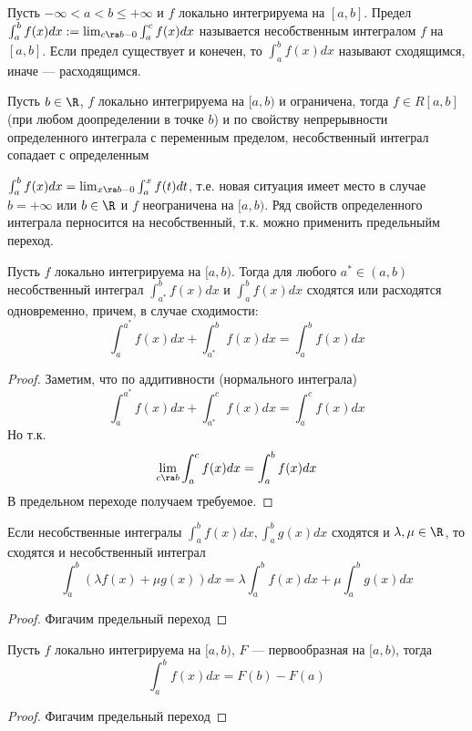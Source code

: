\begin{definition}
    Пусть $-\infty < a < b \le +\infty$ и $f$ локально интегрируема на $[a, b]$. Предел $\int_a^b f(x)dx := \lim_{c \ra b - 0}\int_{a}^{c}f(x)dx$ называется несобственным интегралом $f$ на $[a, b]$. Если предел существует и конечен, то $\int_{a}^{b}f(x)dx$ называют сходящимся, иначе --- расходящимся.
\end{definition}

Пусть $b \in \R$, $f$ локально интегрируема на $[a, b)$ и ограничена, тогда $f \in R[a, b]$ (при любом доопределении в точке $b$) и по свойству непрерывности определенного интеграла с переменным пределом, несобственный интеграл сопадает с определенным

$\int_{a}^{b}f(x)dx = \lim_{x \ra b - 0} \int_{a}^{x}f(t)dt$, т.е. новая ситуация имеет место в случае $b = +\infty$ или $b \in \R$ и $f$ неограничена на $[a, b)$. Ряд свойств определенного интеграла перносится на несобственный, т.к. можно применить предельныйм переход.

\begin{proposition}
    Пусть $f$ локально интегрируема на $[a, b)$. Тогда для любого $a^* \in (a, b)$ несобственный интеграл $\int_{a^*}^{b}f(x)dx$ и $\int_{a}^{b}f(x)dx$ сходятся или расходятся одновременно, причем, в случае сходимости:
    $$\int_{a}^{a^*}f(x)dx + \int_{a^*}^{b}f(x)dx = \int_{a}^{b}f(x)dx$$
\end{proposition}
\begin{proof}
    Заметим, что по аддитивности (нормального интеграла)
    $$\int_{a}^{a^*}f(x)dx + \int_{a^*}^{c}f(x)dx = \int_{a}^{c}f(x)dx$$
    Но т.к. 
    $$\lim_{c \ra b} \int_{a}^{c}f(x)dx = \int_{a}^{b}f(x)dx$$
    В предельном переходе получаем требуемое.
\end{proof}

\begin{proposition}[Линейность]
    Если несобственные интегралы $\int_a^b f(x)dx, \int_a^b g(x)dx$ сходятся и $\lambda, \mu \in \R$, то сходятся и несобственный интеграл 
    $$\int_a^b (\lambda f(x) + \mu g(x))dx = \lambda\int_a^b f(x)dx + \mu\int_a^b g(x)dx$$
\end{proposition}
\begin{proof}
    Фигачим предельный переход
\end{proof}

\begin{proposition}
    Пусть $f$ локально интегрируема на $[a, b)$, $F$ --- первообразная на $[a, b)$, тогда
    $$\int_a^bf(x)dx = F(b) - F(a)$$
\end{proposition}
\begin{proof}
    Фигачим предельный переход
\end{proof}

